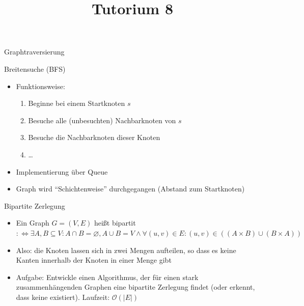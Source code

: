 
\title[Algorithmen I SS 14]{Tutorium 8}

\usepackage{alltt}




\begin{frame}
  \maketitle
\end{frame}

\begin{frame}
	\begin{center}
		\Huge
		Graphtraversierung
	\end{center}
\end{frame}

\begin{frame}{Breitensuche (BFS)}
	\begin{itemize}
		\item Funktionsweise:
			\begin{enumerate}
				\item Beginne bei einem Startknoten $s$
				\item Besuche alle (unbesuchten) Nachbarknoten von $s$
				\item Besuche die Nachbarknoten dieser Knoten
				\item …
			\end{enumerate}
		\item Implementierung über Queue
		\item Graph wird "`Schichtenweise"' durchgegangen (Abstand zum Startknoten)
	\end{itemize}
\end{frame}

\begin{frame}{Bipartite Zerlegung}
	\begin{itemize}
		\item Ein Graph $G = (V, E)$ heißt bipartit $:\Leftrightarrow \exists A, B \subseteq V: A \cap B = \varnothing, A \cup B = V  \wedge  \forall (u, v) \in E: (u, v) \in ((A \times B) \cup (B \times A))$
		\item Also: die Knoten lassen sich in zwei Mengen aufteilen, so dass es keine Kanten innerhalb der Knoten in einer Menge gibt
		\item Aufgabe: Entwickle einen Algorithmus, der für einen stark zusammenhängenden Graphen eine bipartite Zerlegung findet (oder erkennt, dass keine existiert). Laufzeit: $\mathcal{O}(|E|)$
	\end{itemize}
\end{frame}

